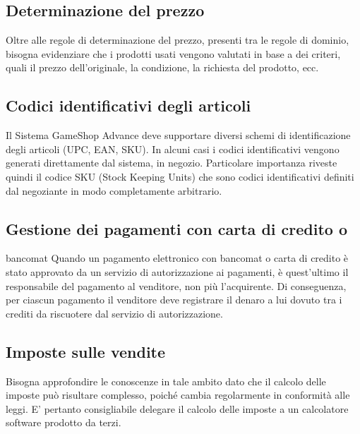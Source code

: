 \documentclass[a4paper,10pt]{report}
\begin{document}
\subsection*{Determinazione del prezzo}
Oltre alle regole di determinazione del prezzo, presenti tra le regole di dominio, bisogna evidenziare che i prodotti usati vengono valutati in base a dei criteri, quali il prezzo dell'originale, la condizione, la richiesta del prodotto, ecc. 

\subsection*{Codici identificativi degli articoli}
Il Sistema GameShop Advance deve supportare diversi schemi di identificazione degli articoli (UPC, EAN, SKU). In alcuni casi i codici identificativi vengono generati direttamente dal sistema, in negozio. Particolare importanza riveste quindi il codice SKU (Stock Keeping Units) che sono codici identificativi definiti dal negoziante in modo completamente arbitrario.

\subsection*{Gestione dei pagamenti con carta di credito o} bancomat
Quando un pagamento elettronico con bancomat o carta di credito è stato approvato da un servizio di autorizzazione ai pagamenti, è quest’ultimo il responsabile del pagamento al venditore, non più l’acquirente. Di conseguenza, per ciascun pagamento il venditore deve registrare il denaro a lui dovuto tra i crediti da riscuotere dal servizio di autorizzazione.

\subsection*{Imposte sulle vendite}
Bisogna approfondire le conoscenze in tale ambito dato che il calcolo delle imposte può risultare complesso, poiché cambia regolarmente in conformità alle leggi. E’ pertanto consigliabile delegare il calcolo delle imposte a un calcolatore software prodotto da terzi.
\end{document}
